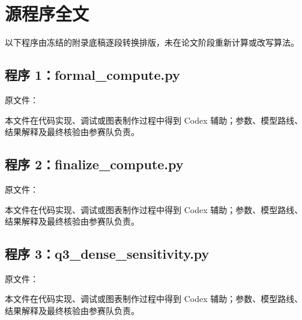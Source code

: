 \clearpage\section{源程序全文}

以下程序由冻结的附录底稿逐段转换排版，未在论文阶段重新计算或改写算法。

\subsection{程序 1：formal\_compute.py}

{\raggedright\noindent 原文件：\par}

本文件在代码实现、调试或图表制作过程中得到 Codex 辅助；参数、模型路线、结果解释及最终核验由参赛队负责。

\begingroup{}


\endgroup

\subsection{程序 2：finalize\_compute.py}

{\raggedright\noindent 原文件：\par}

本文件在代码实现、调试或图表制作过程中得到 Codex 辅助；参数、模型路线、结果解释及最终核验由参赛队负责。

\begingroup{}


\endgroup

\subsection{程序 3：q3\_dense\_sensitivity.py}

{\raggedright\noindent 原文件：\par}

本文件在代码实现、调试或图表制作过程中得到 Codex 辅助；参数、模型路线、结果解释及最终核验由参赛队负责。

